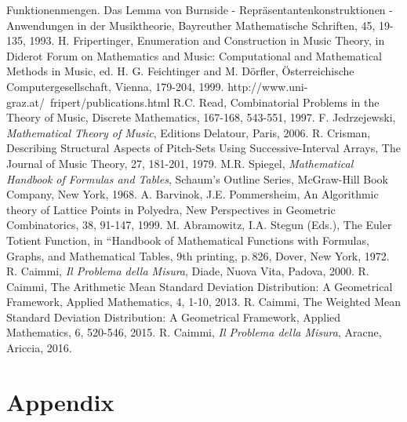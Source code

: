 \documentclass[12pt,a4paper]{article}
\begin{document}
\begin{thebibliography}{}
                Funktionenmengen. Das Lemma von Burnside -
                Repr\"asentantenkonstruktionen - Anwendungen in der
                Musiktheorie, Bayreuther Mathematische Schriften, 45, 19-135,
                1993.
 H. Fripertinger, Enumeration and Construction in Music Theory,
                in Diderot Forum on Mathematics and Music: Computational and 
                Mathematical Methods in Music, ed. H. G. Feichtinger and M.
                D\"orfler,
                \"Osterreichische Computergesellschaft, Vienna, 179-204, 1999.
                http://www.uni-graz.at/~fripert/publications.html 
 R.C. Read, Combinatorial Problems in the Theory of Music, 
                Discrete Mathematics, 167-168, 543-551, 1997.
 F. Jedrzejewski, {\it Mathematical Theory of Music},  Editions
                Delatour, Paris, 2006.  
 R. Crisman, Describing Structural Aspects of Pitch-Sets Using
                Successive-Interval Arrays, The Journal of Music Theory, 27,
                181-201, 1979.
 M.R. Spiegel, {\it Mathematical Handbook of Formulas and
                Tables}, Schaum's Outline Series, McGraw-Hill Book Company,
                New York, 1968.   
  A. Barvinok, J.E. Pommersheim, An Algorithmic theory of
                Lattice Points in Polyedra, New Perspectives in Geometric
                Combinatorics, 38, 91-147, 1999.
  M. Abramowitz, I.A. Stegun (Eds.), The Euler Totient Function,
                in ``Handbook of Mathematical Functions with Formulas, Graphs,
                and Mathematical Tables, 9th printing, p.\,826, Dover,
                New York, 1972.
 R. Caimmi, {\it Il Problema della Misura}, Diade, Nuova Vita, Padova, 2000. 
 R. Caimmi, The Arithmetic Mean Standard Deviation Distribution: A
                         Geometrical Framework, Applied Mathematics, 4, 1-10, 2013.
 R. Caimmi, The Weighted Mean Standard Deviation Distribution: A 
                          Geometrical Framework, Applied Mathematics, 6, 520-546, 2015. 
 R. Caimmi, {\it Il Problema della Misura}, Aracne, Ariccia, 2016. 




\end{thebibliography}

\appendix
\section*{Appendix}
\end{document}
